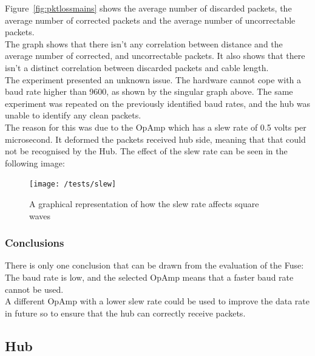 \documentclass[preprint,12pt,3p]{elsarticle}
\begin{document}
Figure~\ref{fig:pktlossmains} shows the average number of discarded packets, the average number of corrected packets and the average number of uncorrectable packets.\\
The graph shows that there isn't any correlation between distance and the average number of corrected, and uncorrectable packets. It also shows that there isn't a distinct correlation between discarded packets and cable length.\\
The experiment presented an unknown issue. The hardware cannot cope with a baud rate higher than 9600, as shown by the singular graph above. The same experiment was repeated on the previously identified baud rates, and the hub was unable to identify any clean packets.\\
The reason for this was due to the OpAmp which has a slew rate of 0.5 volts per microsecond. It deformed the packets received hub side, meaning that that could not be recognised by the Hub. The effect of the slew rate can be seen in the following image:
\begin{figure}[H]
    \centering
    \texttt{[image: /tests/slew]}
    \caption {A graphical representation of how the slew rate affects square waves~\cite{slew}}
\end{figure}

\subsubsection{Conclusions}
There is only one conclusion that can be drawn from the evaluation of the Fuse: The baud rate is low, and the selected OpAmp means that a faster baud rate cannot be used.\\
A different OpAmp with a lower slew rate could be used to improve the data rate in future so to ensure that the hub can correctly receive packets.


\subsection{Hub}
\end{document}
